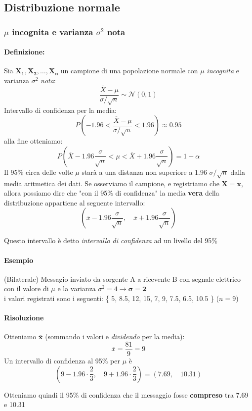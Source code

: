 \documentclass[]{article}
\newcommand{\definizione}{\paragraph{Definizione:}}
\begin{document}
    \subsection{Distribuzione normale}
    \subsubsection{$\mu$ incognita e varianza  $\sigma^2$ nota}
    \definizione Sia $\boldsymbol{X_1, X_2, \ldots, X_n}$ un campione di una popolazione normale con $\mu$ \textit{incognita} e varianza $\sigma^2$ \textit{nota}:
    \[ \frac{\overline{X} - \mu}{\sigma / \sqrt{n}} \sim \mathcal{N}(0,1) \]
    Intervallo di confidenza per la media:
    \[ P \left( -1.96 < \frac{\overline{X} - \mu}{\sigma / \sqrt{n}} < 1.96 \right) \approx 0.95 \]
    alla fine otteniamo:
    \[ P \left( \overline{X} - 1.96 \frac{\sigma}{\sqrt{n}} < \mu < \overline{X} + 1.96 \frac{\sigma}{\sqrt{n}}\right) = 1-\alpha \]
    Il 95\% circa delle volte $\mu$ starà a una distanza non superiore a 1.96 $\sigma / \sqrt{n}$ dalla
    media aritmetica dei dati. Se osserviamo il campione, e registriamo che $\boldsymbol{\overline{X} = \overline{x}}$, allora possiamo dire che "con il 95\% di confidenza" la media \textbf{vera} della distribuzione appartiene al seguente intervallo:
    \[ \left( \overline{x} - 1.96 \frac{\sigma}{\sqrt{n}}, \quad \overline{x} + 1.96 \frac{\sigma}{\sqrt{n}} \right) \]
    \centerline{Questo intervallo è detto \textit{intervallo di confidenza} ad un livello del 95\%}
    \paragraph{Esempio} (Bilaterale) Messagio inviato da sorgente A a ricevente B con segnale elettrico con il valore di $\mu$ e la varianza $\sigma^2 = 4 \rightarrow \boldsymbol{\sigma = 2}$ \\
    i valori registrati sono i seguenti: \{ 5, 8.5, 12, 15, 7, 9, 7.5, 6.5, 10.5 \} ($n = 9$)
    \paragraph{Risoluzione} Otteniamo $\boldsymbol{\overline{x}}$ (sommando i valori e \textit{dividendo} per la media):
    \[ \overline{x} = \frac{81}{9} = 9 \]
    Un intervallo di confidenza al 95\% per $\mu$ è
    \[ \left( 9 - 1.96 \cdot \frac{2}{3}, \quad 9 + 1.96 \cdot \frac{2}{3}\right) = (7.69, \quad 10.31) \]
    \centerline{Otteniamo quindi il 95\% di confidenza che il messaggio fosse \textbf{compreso} tra 7.69 e 10.31}
\end{document}

